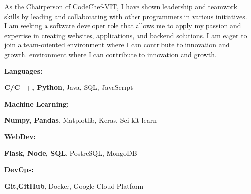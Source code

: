 \documentclass[9pt]{developercv}
\begin{document}
As the Chairperson of CodeChef-VIT, I have shown leadership and teamwork skills by leading and collaborating with other programmers in various initiatives. I am seeking a software developer role that allows me to apply my passion and expertise in creating websites, applications, and backend solutions. I am eager to join a team-oriented environment where I can contribute to innovation and growth. environment where I can contribute to innovation and growth.


\vspace{-6pt}

\begin{minipage}[t]{0.2\textwidth}
  \textbf{Languages:}
\end{minipage}
\hfill
\begin{minipage}[t]{0.73\textwidth}
  \textbf{C/C++, Python}, Java, SQL, JavaScript
\end{minipage}
\vspace{4mm}

\begin{minipage}[t]{0.2\textwidth}
  \textbf{Machine Learning:}
\end{minipage}
\hfill
\begin{minipage}[t]{0.73\textwidth}
  \textbf{Numpy, Pandas}, Matplotlib, Keras, Sci-kit learn
\end{minipage}
\vspace{4mm}

\begin{minipage}[t]{0.2\textwidth}
  \textbf{WebDev:}
\end{minipage}
\hfill
\begin{minipage}[t]{0.73\textwidth}
  \textbf{Flask, Node, SQL}, PostreSQL, MongoDB
\end{minipage}
\vspace{4mm}

\begin{minipage}[t]{0.2\textwidth}
  \textbf{DevOps:}
\end{minipage}
\hfill
\begin{minipage}[t]{0.73\textwidth}
  \textbf{Git,GitHub}, Docker, Google Cloud Platform
\end{minipage}
\end{document}

